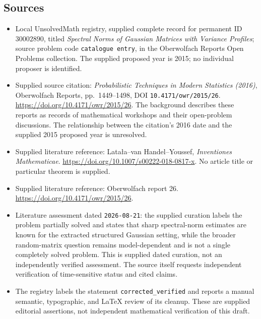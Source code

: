\documentclass[11pt]{article}
\begin{document}
\subsection{Sources}
\begin{itemize}
\item Local UnsolvedMath registry, supplied complete record for permanent ID \(30002890\), titled \emph{Spectral Norms of Gaussian Matrices with Variance Profiles}; source problem code \texttt{catalogue entry}, in the Oberwolfach Reports Open Problems collection. The supplied proposed year is 2015; no individual proposer is identified.
\item Supplied source citation: \emph{Probabilistic Techniques in Modern Statistics (2016)}, Oberwolfach Reports, pp.\ 1449--1498, DOI \texttt{10.4171/owr/2015/26}. \url{https://doi.org/10.4171/owr/2015/26}. The background describes these reports as records of mathematical workshops and their open-problem discussions. The relationship between the citation's 2016 date and the supplied 2015 proposed year is unresolved.
\item Supplied literature reference: Lata\l{}a--van Handel--Youssef, \emph{Inventiones Mathematicae}. \url{https://doi.org/10.1007/s00222-018-0817-x}. No article title or particular theorem is supplied.
\item Supplied literature reference: Oberwolfach report 26. \url{https://doi.org/10.4171/owr/2015/26}.
\item Literature assessment dated \texttt{2026-08-21}: the supplied curation labels the problem partially solved and states that sharp spectral-norm estimates are known for the extracted structured Gaussian setting, while the broader random-matrix question remains model-dependent and is not a single completely solved problem. This is supplied dated curation, not an independently verified assessment. The source itself requests independent verification of time-sensitive status and cited claims.
\item The registry labels the statement \texttt{corrected\_verified} and reports a manual semantic, typographic, and LaTeX review of its cleanup. These are supplied editorial assertions, not independent mathematical verification of this draft.
\end{itemize}
\end{document}
